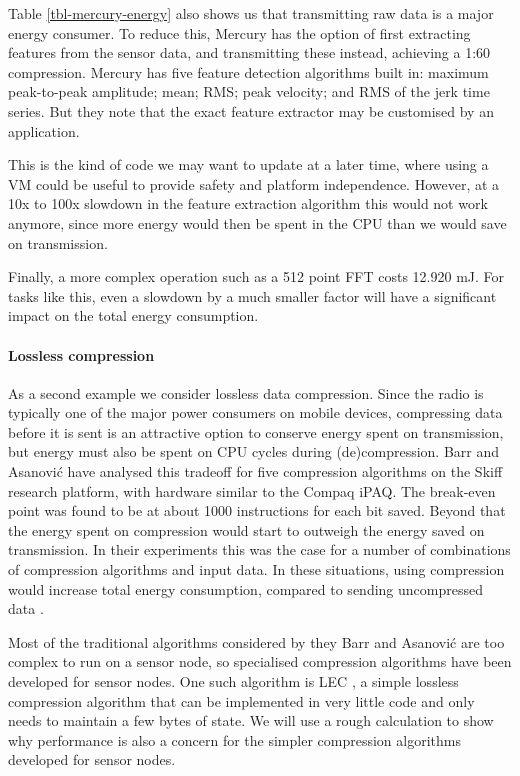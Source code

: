 Table \ref{tbl-mercury-energy} also shows us that transmitting raw data is a major energy consumer. To reduce this, Mercury has the option of first extracting features from the sensor data, and transmitting these instead, achieving a 1:60 compression. Mercury has five feature detection algorithms built in: maximum peak-to-peak amplitude; mean; RMS; peak velocity; and RMS of the jerk time series. But they note that the exact feature extractor may be customised by an application.

This is the kind of code we may want to update at a later time, where using a VM could be useful to provide safety and platform independence. However, at a 10x to 100x slowdown in the feature extraction algorithm this would not work anymore, since more energy would then be spent in the CPU than we would save on transmission.

Finally, a more complex operation such as a 512 point FFT costs 12.920 mJ. For tasks like this, even a slowdown by a much smaller factor will have a significant impact on the total energy consumption.

\paragraph{Lossless compression}
As a second example we consider lossless data compression. Since the radio is typically one of the major power consumers on mobile devices, compressing data before it is sent is an attractive option to conserve energy spent on transmission, but energy must also be spent on CPU cycles during (de)compression. Barr and Asanovi\'c have analysed this tradeoff for five compression algorithms on the Skiff research platform, with hardware similar to the Compaq iPAQ. The break-even point was found to be at about 1000 instructions for each bit saved. Beyond that the energy spent on compression would start to outweigh the energy saved on transmission. In their experiments this was the case for a number of combinations of compression algorithms and input data. In these situations, using compression would increase total energy consumption, compared to sending uncompressed data \cite{Barr:2006vg}.

Most of the traditional algorithms considered by they Barr and Asanovi\'c are too complex to run on a sensor node, so specialised compression algorithms have been developed for sensor nodes. One such algorithm is LEC \cite{Marcelloni:2009ja}, a simple lossless compression algorithm that can be implemented in very little code and only needs to maintain a few bytes of state. We will use a rough calculation to show why performance is also a concern for the simpler compression algorithms developed for sensor nodes.

